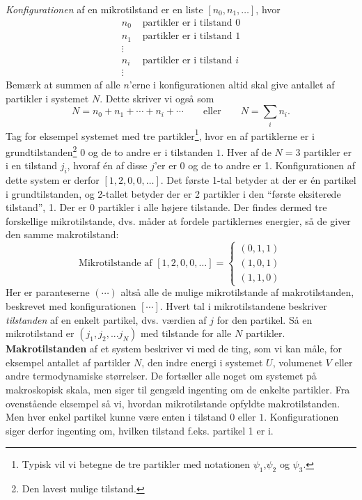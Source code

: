 \textit{Konfigurationen} af en mikrotilstand er en liste $[n_0,n_1,\dots]$, hvor 
\begin{align*}
    n_0 & \text{ partikler er i tilstand 0}\\
    n_1 & \text{ partikler er i tilstand 1}\\
    \vdots & \\
    n_i & \text{ partikler er i tilstand $i$}\\
    \vdots &
\end{align*}
Bemærk at summen af alle $n$'erne i konfigurationen altid skal give antallet af partikler i systemet $N$. Dette skriver vi også som
\begin{equation*}
    N=n_0+n_1+\cdots+n_i+\cdots\qquad\text{eller}\qquad N=\sum_i n_i.
\end{equation*}
Tag for eksempel systemet med tre partikler\footnote{Typisk vil vi betegne de tre partikler med notationen $\psi_1$,$\psi_2$ og $\psi_3$.}, hvor en af partiklerne er i grundtilstanden\footnote{Den lavest mulige tilstand.} $0$ og de to andre er i tilstanden $1$. Hver af de $N=3$ partikler er i en tilstand $j_i$, hvoraf én af disse $j$'er er 0 og de to andre er 1. Konfigurationen af dette system er derfor $[1,2,0,0,\dots]$. Det første 1-tal betyder at der er én partikel i grundtilstanden, og 2-tallet betyder der er 2 partikler i den ``første eksiterede tilstand'', 1. Der er 0 partikler i alle højere tilstande. Der findes dermed tre forskellige mikrotilstande, dvs. måder at fordele partiklernes energier, så de giver den samme makrotilstand:
\begin{equation*}
    \text{Mikrotilstande af } [1,2,0,0,\dots] = \left\{\begin{matrix}(0,1,1)\\(1,0,1)\\(1,1,0)\end{matrix}\right.
\end{equation*}
Her er paranteserne $(\cdots)$ altså alle de mulige mikrotilstande af makrotilstanden, beskrevet med konfigurationen $[\cdots]$.
Hvert tal i mikrotilstandene beskriver \emph{tilstanden} af en enkelt partikel, dvs. værdien af $j$ for den partikel. Så en mikrotilstand er $(j_1,j_2,...j_N)$ med tilstande for alle $N$ partikler.\\[12pt]
\textbf{Makrotilstanden} af et system beskriver vi med de ting, som vi kan måle, for eksempel antallet af partikler $N$, den indre energi i systemet $U$, volumenet $V$ eller andre termodynamiske størrelser. De fortæller alle noget om systemet på makroskopisk skala, men siger til gengæld ingenting om de enkelte partikler. Fra ovenstående eksempel så vi, hvordan mikrotilstande opfyldte makrotilstanden. Men hver enkel partikel kunne være enten i tilstand $0$ eller $1$. Konfigurationen siger derfor ingenting om, hvilken tilstand f.eks. partikel 1 er i.\\
